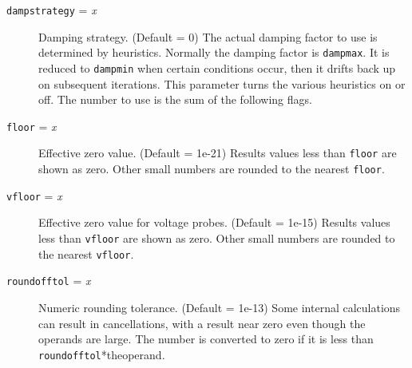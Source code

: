 \begin{description}
\item[{\tt dampstrategy} = {\it x}] Damping strategy.  (Default =
0)  The actual damping factor to use is determined by heuristics.
Normally the damping factor is {\tt dampmax}.  It is reduced to
{\tt dampmin} when certain conditions occur, then it drifts back
up on subsequent iterations.  This parameter turns the various
heuristics on or off.  The number to use is the sum of the following
flags.

        
\item[{\tt floor} = {\it x}] Effective zero value.  (Default =
1e-21) Results values less than {\tt floor} are shown as zero.  Other
small numbers are rounded to the nearest {\tt floor}.
        
\item[{\tt vfloor} = {\it x}] Effective zero value for voltage probes.
(Default = 1e-15) Results values less than {\tt vfloor} are shown as
zero.  Other small numbers are rounded to the nearest {\tt vfloor}.
        
\item[{\tt roundofftol} = {\it x}]
Numeric rounding tolerance. (Default = 1e-13) Some internal
calculations can result in cancellations, with a result near zero even
though the operands are large.  The number is converted to zero if it
is less than {\tt roundofftol}*theoperand.


\end{description}
